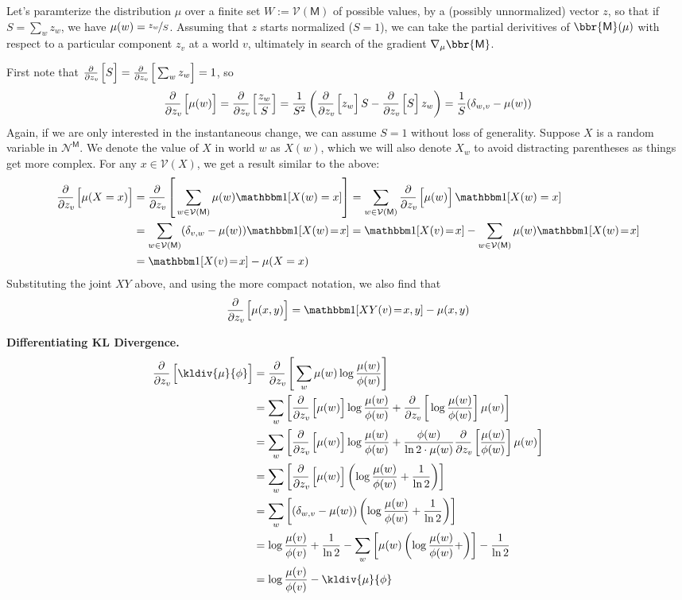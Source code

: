 \documentclass{article}
\newcommand{\V}{\mathcal V}
\newcommand{\N}{\mathcal N}
\newcommand{\sfM}{\mathsf M}
\begin{document}
	\def\pz#1{\frac{\partial}{\partial z_v\!}\left[\vphantom{\Big|}#1\right]}
	Let's paramterize the distribution $\mu$ over a finite set $W := \V(\sfM)$ of possible values, by a (possibly unnormalized) vector $z$, so that if $S = \sum_{w} z_w$, we have $\mu(w) = \nicefrac{z_w}{S}$. Assuming that $z$ starts normalized ($S = 1$), we can take the partial derivitives of $\bbr{\sfM}(\mu)$ with respect to a particular component $z_v$ at a world $v$, ultimately in search of the gradient $\nabla_{\mu} \bbr{\sfM}$.
		
	First note that $\pz{S} = \pz{\sum_w z_w} = 1$, so
	\[ \pz{\mu(w)} = \pz{\frac{z_w}{S}} 
		= \frac{1}{S^2} \left(\pz{z_w} {S} - \pz{S}z_w \right) 
		= \frac{1}{S}(\delta_{w,v} - \mu(w))
	\]
	Again, if we are only interested in the instantaneous change, we can assume $S = 1$ without loss of generality.
	Suppose $X$ is a random variable in $\N^\sfM$. We denote the value of $X$ in world $w$ as $X(w)$, which we will also denote $X_w$ to avoid distracting parentheses as things get more complex. For any $x \in \V(X)$, we get a result similar to the above:
	\begin{align*} \pz{\mu(X = x)}
	  	&= \pz{\sum_{w \in \V(\sfM)} \mu(w) \mathbbm1[X(w) = x]}
	 	= \sum_{w \in \V(\sfM)} \pz{\mu(w)} \mathbbm1[X(w) = x] \\
	 	&= \sum_{w \in \V(\sfM)} (\delta_{v,w} - \mu(w)) \mathbbm1[X(w) \!=\! x]
	 	= \mathbbm1[X(v) \!=\! x] - \sum_{w \in \V(\sfM)} \mu(w) \mathbbm1[X(w) \!=\! x] \\
	 	&=  \mathbbm1[X(v) \!=\! x]  - \mu(X = x)
	\end{align*}
	Substituting the joint $XY$ above, and using the more compact notation, we also find that
	\[ \pz{\mu(x,y)} = \mathbbm1[XY(v) \!=\! x,y] - \mu(x,y) \] 
	
	\textbf{Differentiating KL Divergence.}
	\begin{align*}
		\pz{\kldiv{\mu}{\phi}} &= \pz{\sum_w \mu(w) \log \frac{\mu(w)}{\phi(w)}} \\
			&= \sum_w \left[ \pz{\mu(w)} \log \frac{\mu(w)}{\phi(w)} + \pz{\log\frac{\mu(w)}{\phi(w)} }\mu(w) \right] \\
			&=\sum_w \left[ \pz{\mu(w)} \log \frac{\mu(w)}{\phi(w)} + \frac{\phi(w)}{\ln 2\cdot\mu(w)} \pz{\frac{\mu(w)}{\phi(w)}} \mu(w) \right] \\
			&=\sum_w \left[ \pz{\mu(w)} \left(\log \frac{\mu(w)}{\phi(w)} + \frac{1}{\ln 2} \right) \right] \\
			&=\sum_w \left[ (\delta_{w,v} - \mu(w)) \left(\log \frac{\mu(w)}{\phi(w)} + \frac{1}{\ln 2} \right) \right] \\
			&= \log \frac{\mu(v)}{\phi(v)} + \frac{1}{\ln 2} - \sum_w \left[ \mu(w) \left(\log \frac{\mu(w)}{\phi(w)} +  \right) \right] - \frac{1}{\ln 2} \\
			&= \log \frac{\mu(v)}{\phi(v)} - \kldiv{\mu}{\phi} \\
	\end{align*}
	
\end{document}
